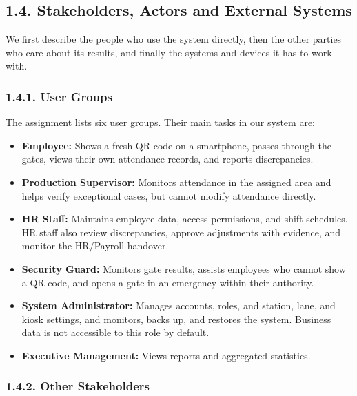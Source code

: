 \subsection*{1.4. Stakeholders, Actors and External Systems}

{}

We first describe the people who use the system directly, then the other parties who care about its results, and finally the systems and devices it has to work with.

\subsubsection*{1.4.1. User Groups}

{}

The assignment lists six user groups. Their main tasks in our system are:

\begin{itemize}[leftmargin=36pt, itemsep=2pt, topsep=4pt, parsep=2pt]
  \item \textbf{Employee:} Shows a fresh QR code on a smartphone, passes through the gates, views their own attendance records, and reports discrepancies.
  \item \textbf{Production Supervisor:} Monitors attendance in the assigned area and helps verify exceptional cases, but cannot modify attendance directly.
  \item \textbf{HR Staff:} Maintains employee data, access permissions, and shift schedules. HR staff also review discrepancies, approve adjustments with evidence, and monitor the HR/Payroll handover.
  \item \textbf{Security Guard:} Monitors gate results, assists employees who cannot show a QR code, and opens a gate in an emergency within their authority.
  \item \textbf{System Administrator:} Manages accounts, roles, and station, lane, and kiosk settings, and monitors, backs up, and restores the system. Business data is not accessible to this role by default.
  \item \textbf{Executive Management:} Views reports and aggregated statistics.
\end{itemize}

\subsubsection*{1.4.2. Other Stakeholders}

